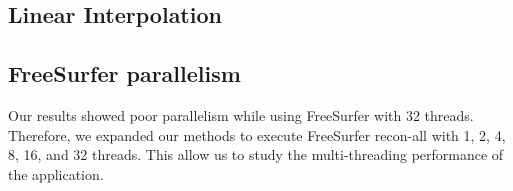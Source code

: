 \documentclass[conference]{IEEEtran}
\begin{document}
\subsection{Linear Interpolation}

\subsection{FreeSurfer parallelism}
Our results showed poor parallelism while using FreeSurfer with 32 threads. Therefore, we expanded our methods to execute FreeSurfer recon-all with 1, 2, 4, 8, 16, and 32 threads. This allow us to study the multi-threading performance of the application.
\end{document}
